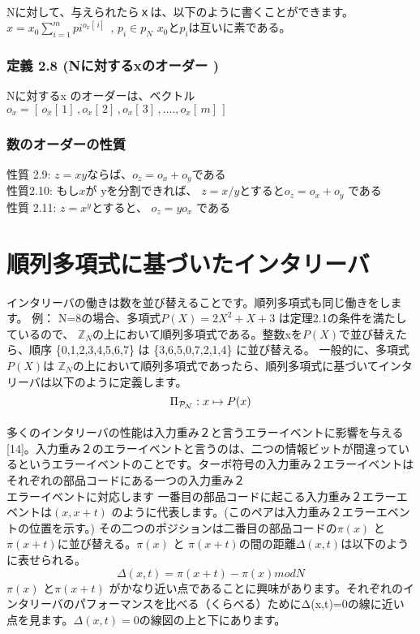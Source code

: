 \documentclass[20 pts]{article}
\begin{document}
\paragraph{}
Nに対して、与えられたらｘは、以下のように書くことができます。\newline
$x=x_0 \sum_{i=1}^m pi^{o_x[\,i]\,}$ ,
$p_i\in p_N$	$x_0$と$p_i$は互いに素である。

\subsubsection{定義   2.8  (Nに対するxのオーダー )}
 Nに対するx のオーダーは、ベクトル $o_x=[\,o_x [\,1]\,,o_x [\,2]\,,o_x [\,3]\,,….,o_x [\,m]\,]\,$

\subsubsection{数のオーダーの性質}
性質 2.9:   $ z=xy$ならば、$o_z=o_x+o_y$である                  
\\性質2.10:  もし$x$が yを分割できれば、 $z=x/y$とすると$ o_z=o_x+o_y$ である \\            
性質 2.11:   $z=x^y$とすると、 $o_z=yo_x$ である

\section{順列多項式に基づいたインタリーバ}
インタリーバの働きは数を並び替えることです。順列多項式も同じ働きをします。
例：
N=8の場合、多項式$P(X)=2X^2+X+3$ は定理2.1の条件を満たしているので、 $\mathbb{Z}_N$の上において順列多項式である。整数xを$P(X)$で並び替えたら、順序 \{0,1,2,3,4,5,6,7\} は \{3,6,5,0,7,2,1,4\} に並び替える。
一般的に、多項式$P(X)$は $\mathbb{Z}_N$の上において順列多項式であったら、順列多項式に基づいてインタリーバは以下のように定義します。\\
$$\Pi_{\cal{P}_N}:x\mapsto P(x)$$
\paragraph{}
多くのインタリーバの性能は入力重み２と言うエラーイベントに影響を与える[14]。入力重み２のエラーイベントと言うのは、二つの情報ビットが間違っているというエラーイベントのことです。ターボ符号の入力重み２エラーイベントはそれぞれの部品コードにある一つの入力重み２\\エラーイベントに対応します
一番目の部品コードに起こる入力重み２エラーエベントは$(x,x+t)$  のように代表します。(このペアは入力重み２エラーエベントの位置を示す。) その二つのポジションは二番目の部品コードの$\pi(x)$ と$\pi(x+t)$に並び替える。$\pi(x)$ と $\pi(x+t)$の間の距離$\Delta(x,t)$は以下のように表せられる。$$\Delta(x,t) = \pi(x+t) - \pi(x)  mod N$$
$\pi(x)$ と$\pi(x+t)$ がかなり近い点であることに興味があります。それぞれのインタリーバのパフォーマンスを比べる（くらべる）ためにΔ(x,t)=0の線に近い点を見ます。$\Delta(x,t)=0$の線図の上と下にあります。
\end{document}
